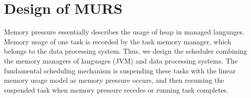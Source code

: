 \section{Design of MURS}
\label{sec:desgin}

Memory pressure essentially describes the usage of heap in managed languages. Memory usage of one task is recorded by the task memory manager, which belongs to the data processing system. Thus, we design the scheduler combining the memory managers of languages (JVM) and data processing systems. The fundamental scheduling mechanism is suspending these tasks with the linear memory usage model as memory pressure occurs, and then resuming the suspended task when memory pressure recedes or running task completes.





